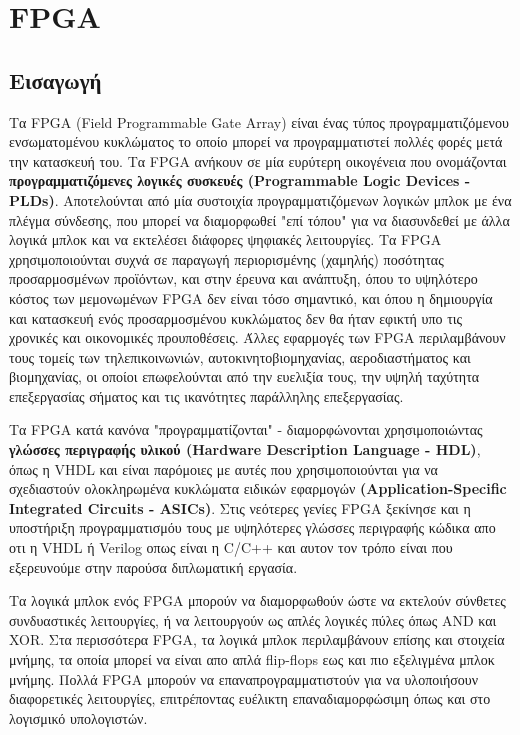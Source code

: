 \chapter{FPGA}
\label{ch:into}

\section{Εισαγωγή}

Τα FPGA (Field Programmable Gate Array) είναι ένας τύπος προγραμματιζόμενου ενσωματομένου κυκλώματος το οποίο μπορεί να προγραμματιστεί πολλές φορές μετά την κατασκευή του.
Τα FPGA ανήκουν σε μία ευρύτερη οικογένεια που ονομάζονται \textbf{προγραμματιζόμενες λογικές συσκευές (Programmable Logic Devices - PLDs)}. 
Αποτελούνται από μία συστοιχία προγραμματιζόμενων λογικών μπλοκ με ένα πλέγμα σύνδεσης, που μπορεί να διαμορφωθεί "επί τόπου" για να διασυνδεθεί με άλλα λογικά μπλοκ 
και να εκτελέσει διάφορες ψηφιακές λειτουργίες. Τα FPGA χρησιμοποιούνται συχνά σε παραγωγή περιορισμένης (χαμηλής) ποσότητας προσαρμοσμένων προϊόντων,
και στην έρευνα και ανάπτυξη, όπου το υψηλότερο κόστος των μεμονωμένων FPGA δεν είναι τόσο σημαντικό, και όπου η δημιουργία και κατασκευή ενός προσαρμοσμένου κυκλώματος
δεν θα ήταν εφικτή υπο τις χρονικές και οικονομικές προυποθέσεις. Άλλες εφαρμογές των FPGA περιλαμβάνουν τους τομείς των τηλεπικοινωνιών, αυτοκινητοβιομηχανίας, αεροδιαστήματος 
και βιομηχανίας, οι οποίοι επωφελούνται από την ευελιξία τους, την υψηλή ταχύτητα επεξεργασίας σήματος και τις ικανότητες παράλληλης επεξεργασίας.

Τα FPGA κατά κανόνα "προγραμματίζονται" - διαμορφώνονται χρησιμοποιώντας \textbf{γλώσσες περιγραφής υλικού (Hardware Description Language - HDL)}, όπως η VHDL και είναι παρόμοιες με αυτές 
που χρησιμοποιούνται για να σχεδιαστούν ολοκληρωμένα κυκλώματα ειδικών εφαρμογών \textbf{(Application-Specific Integrated Circuits - ASICs)}. 
Στις νεότερες γενίες FPGA ξεκίνησε και η υποστήριξη προγραμματισμόυ τους με υψηλότερες γλώσσες περιγραφής κώδικα απο οτι η VHDL ή Verilog οπως είναι η C/C++ 
και αυτον τον τρόπο είναι που εξερευνούμε στην παρούσα διπλωματική εργασία.

Τα λογικά μπλοκ ενός FPGA μπορούν να διαμορφωθούν ώστε να εκτελούν σύνθετες συνδυαστικές λειτουργίες, ή να λειτουργούν ως απλές λογικές πύλες όπως AND και XOR. 
Στα περισσότερα FPGA, τα λογικά μπλοκ περιλαμβάνουν επίσης και στοιχεία μνήμης, τα οποία μπορεί να είναι απο απλά flip-flops εως και πιο εξελιγμένα μπλοκ μνήμης. 
Πολλά FPGA μπορούν να επαναπρογραμματιστούν για να υλοποιήσουν διαφορετικές λειτουργίες, επιτρέποντας ευέλικτη επαναδιαμορφώσιμη όπως και στο λογισμικό υπολογιστών.

